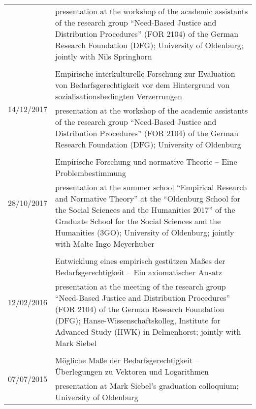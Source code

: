 \documentclass[a4paper,10pt]{article}
\begin{document}
\begin{longtable}{p{2.25cm}p{11cm}}
& \footnotesize{presentation at the workshop of the academic assistants of the research group \enquote{Need-Based Justice and Distribution Procedures} (FOR 2104) of the German Research Foundation (DFG); University of Oldenburg; jointly with Nils Springhorn}\\
\\
\multirow{2}{2.25cm}{\footnotesize{14/12/2017}} & Empirische interkulturelle Forschung zur Evaluation von Bedarfsgerechtigkeit vor dem Hintergrund von sozialisationsbedingten Verzerrungen\\
& \footnotesize{presentation at the workshop of the academic assistants of the research group \enquote{Need-Based Justice and Distribution Procedures} (FOR 2104) of the German Research Foundation (DFG); University of Oldenburg}\\
\\
\multirow{2}{2.25cm}{\footnotesize{28/10/2017}} & Empirische Forschung und normative Theorie -- Eine Problembestimmung\\
& \footnotesize{presentation at the summer school \enquote{Empirical Research and Normative Theory} at the \enquote{Oldenburg School for the Social Sciences and the Humanities 2017} of the Graduate School for the Social Sciences and the Humanities (3GO); University of Oldenburg; jointly with Malte Ingo Meyerhuber}\\
\\
\multirow{2}{2.25cm}{\footnotesize{12/02/2016}} & Entwicklung eines empirisch gestützen Maßes der Bedarfsgerechtigkeit -- Ein axiomatischer Ansatz\\
& \footnotesize{presentation at the meeting of the research group \enquote{Need-Based Justice and Distribution Procedures} (FOR 2104) of the German Research Foundation (DFG); Hanse-Wissenschaftskolleg, Institute for Advanced Study (HWK) in Delmenhorst; jointly with Mark Siebel}\\
\\
\multirow{2}{2.25cm}{\footnotesize{07/07/2015}} & Mögliche Maße der Bedarfsgerechtigkeit -- Überlegungen zu Vektoren und Logarithmen\\
& \footnotesize{presentation at Mark Siebel's graduation colloquium; University of Oldenburg}\\
\end{longtable}


\clearpage
\end{document}
